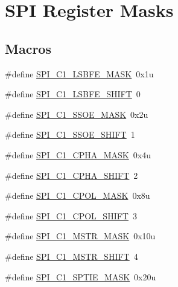 \hypertarget{group___s_p_i___register___masks}{}\section{S\+PI Register Masks}
\label{group___s_p_i___register___masks}
\subsection*{Macros}
\begin{DoxyCompactItemize}
\item 
\#define \hyperlink{group___s_p_i___register___masks_ga45f4cb42020607c9ed927bf57cc0ee31}{S\+P\+I\+\_\+\+C1\+\_\+\+L\+S\+B\+F\+E\+\_\+\+M\+A\+SK}~0x1u
\item 
\#define \hyperlink{group___s_p_i___register___masks_gaa81af414d42c393342df48ae8d44c27f}{S\+P\+I\+\_\+\+C1\+\_\+\+L\+S\+B\+F\+E\+\_\+\+S\+H\+I\+FT}~0
\item 
\#define \hyperlink{group___s_p_i___register___masks_ga18d4e12a34e268e98cf29ef47ff46e21}{S\+P\+I\+\_\+\+C1\+\_\+\+S\+S\+O\+E\+\_\+\+M\+A\+SK}~0x2u
\item 
\#define \hyperlink{group___s_p_i___register___masks_gaa5941a1db540652e8da7f3881eb39384}{S\+P\+I\+\_\+\+C1\+\_\+\+S\+S\+O\+E\+\_\+\+S\+H\+I\+FT}~1
\item 
\#define \hyperlink{group___s_p_i___register___masks_gaaf85a831465f0f4f302657b32171f2e6}{S\+P\+I\+\_\+\+C1\+\_\+\+C\+P\+H\+A\+\_\+\+M\+A\+SK}~0x4u
\item 
\#define \hyperlink{group___s_p_i___register___masks_gaa305ee06e9cb66ad7ba9aed297debef3}{S\+P\+I\+\_\+\+C1\+\_\+\+C\+P\+H\+A\+\_\+\+S\+H\+I\+FT}~2
\item 
\#define \hyperlink{group___s_p_i___register___masks_ga8f4bd038e37f3581231f26aafc33c7b1}{S\+P\+I\+\_\+\+C1\+\_\+\+C\+P\+O\+L\+\_\+\+M\+A\+SK}~0x8u
\item 
\#define \hyperlink{group___s_p_i___register___masks_ga1d5b3d92574037e1073a569653cf5a9b}{S\+P\+I\+\_\+\+C1\+\_\+\+C\+P\+O\+L\+\_\+\+S\+H\+I\+FT}~3
\item 
\#define \hyperlink{group___s_p_i___register___masks_ga747d64528ec249cad76dc87b67e457e6}{S\+P\+I\+\_\+\+C1\+\_\+\+M\+S\+T\+R\+\_\+\+M\+A\+SK}~0x10u
\item 
\#define \hyperlink{group___s_p_i___register___masks_ga67f4db47142cf9e5cb239db0f5af79d7}{S\+P\+I\+\_\+\+C1\+\_\+\+M\+S\+T\+R\+\_\+\+S\+H\+I\+FT}~4
\item 
\#define \hyperlink{group___s_p_i___register___masks_ga9a819839ef92c4a16fcbe0403dada66a}{S\+P\+I\+\_\+\+C1\+\_\+\+S\+P\+T\+I\+E\+\_\+\+M\+A\+SK}~0x20u

\end{DoxyCompactItemize}
